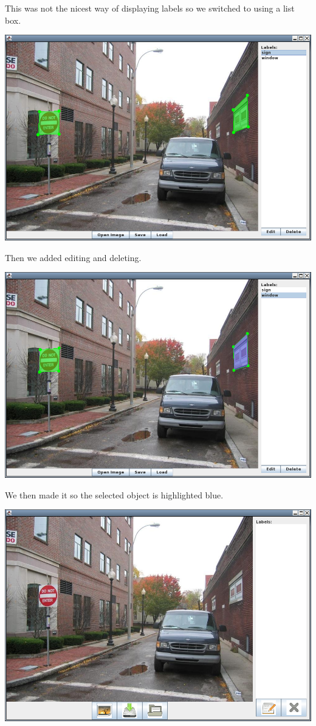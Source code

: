 \documentclass[a4paper,11pt,oneside]{article}
\begin{document}
This was not the nicest way of displaying labels so we switched to using a list
box.

\includegraphics[width=\textwidth]{old7.png}

Then we added editing and deleting.

\includegraphics[width=\textwidth]{old8.png}

We then made it so the selected object is highlighted blue.

\includegraphics[width=\textwidth]{old9.png}
\end{document}
